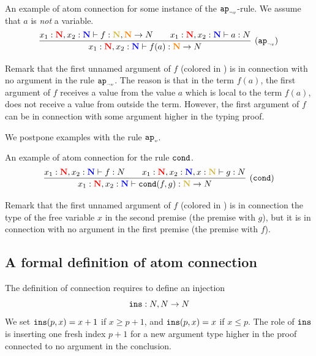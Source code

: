 \documentclass{article}
\begin{document}
\begin{Eg}\label{eg:1}\rm
An example of  atom connection for some instance of the ${{\tt ap}_{\mbox{\tiny $\neg v$}}}$-rule.
We assume that $a$ is \emph{not} a variable.
\[
\infer[(\apnotvar)]
{  {x_1} : \bfColor{red}{\N},{x_2} : \bfColor{blue}{\N}
					\prove f(a) : \bfColor{orange}{\N} \rightarrow \N}
    {
	  {   {x_1} : \bfColor{red}{\N},{x_2} : \bfColor{blue}{\N}
					\prove f : \bfColor{oldgold}{\N}, \bfColor{orange}{\N} \rightarrow \N}
      {\ \ \ \ \ \ }
      {   {x_1} : \bfColor{red}{\N}, x_2: \bfColor{blue}{\N}
					\prove a : \N}
	}
\]
\end{Eg}
Remark that the first unnamed argument of $f$ (colored in ) 
is in connection with no argument in the rule ${{\tt ap}_{\mbox{\tiny $\neg v$}}}$.
The reason is that in the term $f(a)$,
the first argument of $f$ receives a value from the value $a$ which is local to the term $f(a)$,
does not receive a value from outside the term.
However, the first argument of $f$ can be in connection with some argument higher in the typing proof. 

We postpone examples with the rule ${{\tt ap}_{\mbox{\tiny $v$}}}$.

\begin{Eg}\label{eg:2}\rm
An example of  atom connection for the rule ${\tt cond}$.
\[
\infer[(\cond)]
{  {x_1} : \bfColor{red}{\N},{x_2} : \bfColor{blue}{\N}
					\prove \cond(f,g) : \bfColor{oldgold}{\N} \rightarrow \N}
    {
      {   {x_1} : \bfColor{red}{\N},{x_2} : \bfColor{blue}{\N}
					\prove f : \N}
           {\ \ \ \ \ \ }
	  {   {x_1} : \bfColor{red}{\N},{x_2} : \bfColor{blue}{\N}, x  : \bfColor{oldgold}{\N} 
					\prove g : \N}
    }
\]
\end{Eg}
Remark that the first unnamed argument of $f$ (colored in ) 
is in connection the type of the free variable $x$ in the second premise (the premise with $g$),
but it is in connection with no argument in the first premise (the premise with $f$).


\subsection{A formal definition of atom connection}
The definition of connection requires to define an injection 
$$
{\tt ins}:{N},{N} \rightarrow{N}
$$
We set ${\tt ins}(p,x)=x+1$ if $x \ge p+1$, and ${\tt ins}(p,x)=x$ if $x\le p$.
The role of ${\tt ins}$ is inserting one fresh index $p+1$ for a new argument type higher in the proof
connected to no argument in the conclusion.
\end{document}
